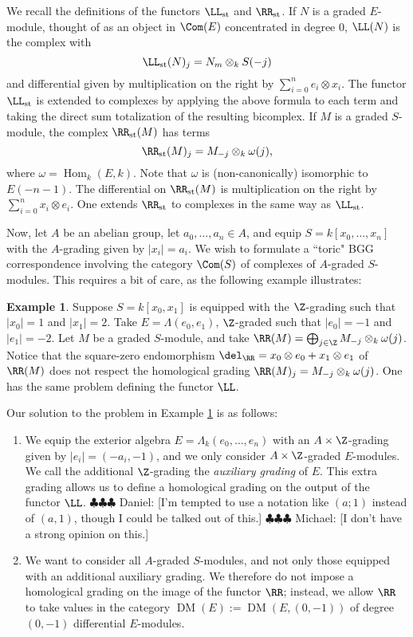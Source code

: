 \documentclass[12pt]{amsart}
\theoremstyle{definition}
\newtheorem{example}[lemma]{Example}
\theoremstyle{remark}
\newcommand{\Hom}{\operatorname{Hom}} %
\newcommand{\daniel}[1]{{\color{blue} \sf $\clubsuit\clubsuit\clubsuit$ Daniel: [#1]}}
\newcommand{\michael}[1]{{\color{red} \sf $\clubsuit\clubsuit\clubsuit$ Michael: [#1]}}
\def\on{\operatorname}
\def\DM{\operatorname{DM}}
\def\o{\omega}
\begin{document}
We recall the definitions of the functors $\LL_{\on{st}}$ and $\RR_{\on{st}}$. If $N$ is a graded $E$-module, thought of as an object in $\Com(E)$ concentrated in degree 0, $\LL(N)$ is the complex with
$$
\LL_{\on{st}}(N)_j = N_m \otimes_k S(-j)
$$
and differential given by multiplication on the right by $\sum_{i = 0}^n e_i \otimes x_i$. The functor $\LL_{\on{st}}$ is extended to complexes by applying the above formula to each term and taking the direct sum totalization of the resulting bicomplex. If $M$ is a graded $S$-module, the complex $\RR_{\on{st}}(M)$ has terms
$$
\RR_{\on{st}}(M)_j = M_{-j} \otimes_k \o(j), 
$$
where $\o = \Hom_k(E, k)$. Note that $\o$ is (non-canonically) isomorphic to $E(-n-1)$. The differential on $\RR_{\on{st}}(M)$ is multiplication on the right by $ \sum_{i = 0}^n x_i \otimes e_i$. One extends $\RR_{\on{st}}$ to complexes in the same way as $\LL_{\on{st}}$. 




Now, let $A$ be an abelian group, let $a_0, \dots, a_n \in A$, and equip $S = k[x_0, \dots, x_n]$ with the $A$-grading given by $|x_i| = a_i$. We wish to formulate a ``toric" BGG correspondence involving the category $\Com(S)$ of complexes of $A$-graded $S$-modules. This requires a bit of care, as the following example illustrates:

\begin{example}
\label{grading}
Suppose $S = k[x_0, x_1]$ is equipped with the $\Z$-grading such that $|x_0| = 1$ and $|x_1| = 2$. Take $E= \Lambda(e_0, e_1)$, $\Z$-graded such that $|e_0| = -1$ and $|e_1| = -2$. Let $M$ be a graded $S$-module, and take $\RR(M) = \bigoplus_{j \in \Z} M_{-j} \otimes_k \o(j)$. Notice that the square-zero endomorphism $\del_{\RR} = x_0 \otimes e_0 + x_1 \otimes e_1$ of $\RR(M)$ does not respect the homological grading $\RR(M)_j = M_{-j} \otimes_k \o(j)$. One has the same problem defining the functor $\LL$.
\end{example}

Our solution to the problem in Example \ref{grading} is as follows:
\begin{enumerate}
\item We equip the exterior algebra $E = \Lambda_k(e_0, \dots, e_n)$ with an $A \times \Z$-grading given by $|e_i| = (-a_i, -1)$, and we only consider $A \times \Z$-graded $E$-modules. We call the additional $\Z$-grading the \emph{auxiliary grading} of $E$. This extra grading allows us to define a homological grading on the output of the functor $\LL$. \daniel{I'm tempted to use a notation like $(a;1)$ instead of $(a,1)$, though I could be talked out of this.} \michael{I don't have a strong opinion on this.}
\item We want to consider all $A$-graded $S$-modules, and not only those equipped with an additional auxiliary grading. We therefore do not impose a homological grading on the image of the functor $\RR$; instead, we allow $\RR$ to take values in the category $\DM(E) := \DM(E , (0, -1))$ of degree $(0, -1)$ differential $E$-modules.
\end{enumerate}
\end{document}
